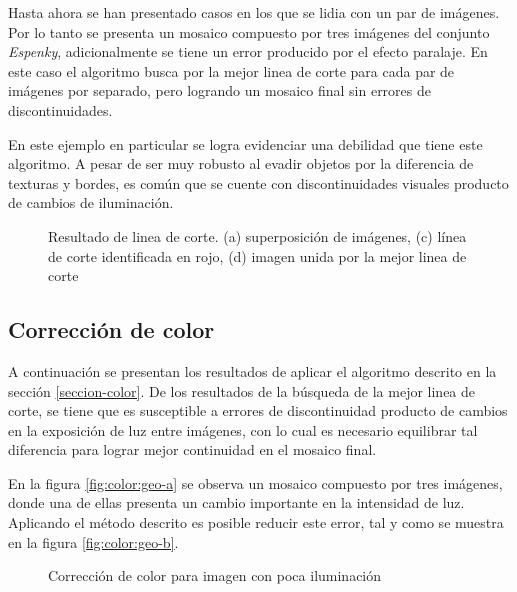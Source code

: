 Hasta ahora se han presentado casos en los que se lidia con un par de imágenes. Por lo tanto se presenta un mosaico compuesto por tres imágenes del conjunto \textit{Espenky}, adicionalmente se tiene un error producido por el efecto paralaje. En este caso el algoritmo busca por la mejor linea de corte para cada par de imágenes por separado, pero logrando un mosaico final sin errores de discontinuidades.

En este ejemplo en particular se logra evidenciar una debilidad que tiene este algoritmo. A pesar de ser muy robusto al evadir objetos por la diferencia de texturas y bordes, es común que se cuente con discontinuidades visuales producto de cambios de iluminación.

\begin{figure}[H]
	\centering     %
	
	
	\caption[Resultado de linea de corte: \textit{Espenky}]{Resultado de linea de corte. (a) superposición de imágenes, (c) línea de corte identificada en rojo, (d) imagen unida por la mejor linea de corte}
	\label{imagen:cut:espenky}
\end{figure}


\subsection*{Corrección de color}

A continuación se presentan los resultados de aplicar el algoritmo descrito en la sección \ref{seccion-color}. De los resultados de la búsqueda de la mejor linea de corte, se tiene que es susceptible a errores de discontinuidad producto de cambios en la exposición de luz entre imágenes, con lo cual es necesario equilibrar tal diferencia para lograr mejor continuidad en el mosaico final.

En la figura \ref{fig:color:geo-a} se observa un mosaico compuesto por tres imágenes, donde una de ellas presenta un cambio importante en la intensidad de luz. Aplicando el método descrito es posible reducir este error, tal y como se muestra en la figura \ref{fig:color:geo-b}.

\begin{figure}[H]
	\centering     %
	
	\caption[Resultados de corrección de color: \textit{Grava}]{Corrección de color para imagen con poca iluminación}
	\label{imagen:color:geo}
\end{figure}

